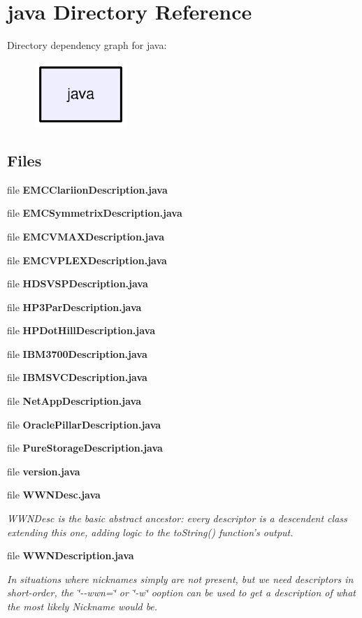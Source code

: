 \section{java Directory Reference}
\label{dir_93c6ba7fb77bae0709fae89c9c13b44a}
Directory dependency graph for java\-:\nopagebreak
\begin{figure}[H]
\begin{center}
\leavevmode
\includegraphics[width=98pt]{dir_93c6ba7fb77bae0709fae89c9c13b44a_dep}
\end{center}
\end{figure}
\subsection*{Files}
\begin{DoxyCompactItemize}
\item 
file {\bf E\-M\-C\-Clariion\-Description.\-java}
\item 
file {\bf E\-M\-C\-Symmetrix\-Description.\-java}
\item 
file {\bf E\-M\-C\-V\-M\-A\-X\-Description.\-java}
\item 
file {\bf E\-M\-C\-V\-P\-L\-E\-X\-Description.\-java}
\item 
file {\bf H\-D\-S\-V\-S\-P\-Description.\-java}
\item 
file {\bf H\-P3\-Par\-Description.\-java}
\item 
file {\bf H\-P\-Dot\-Hill\-Description.\-java}
\item 
file {\bf I\-B\-M3700\-Description.\-java}
\item 
file {\bf I\-B\-M\-S\-V\-C\-Description.\-java}
\item 
file {\bf Net\-App\-Description.\-java}
\item 
file {\bf Oracle\-Pillar\-Description.\-java}
\item 
file {\bfseries Pure\-Storage\-Description.\-java}
\item 
file {\bfseries version.\-java}
\item 
file {\bf W\-W\-N\-Desc.\-java}
\begin{DoxyCompactList}\small\item\em W\-W\-N\-Desc is the basic abstract ancestor\-: every descriptor is a descendent class extending this one, adding logic to the to\-String() function's output. \end{DoxyCompactList}\item 
file {\bf W\-W\-N\-Description.\-java}
\begin{DoxyCompactList}\small\item\em In situations where nicknames simply are not present, but we need descriptors in short-\/order, the \char`\"{}-\/-\/wwn=\char`\"{} or \char`\"{}-\/w\char`\"{} ooption can be used to get a description of what the most likely Nickname would be. \end{DoxyCompactList}\end{DoxyCompactItemize}
